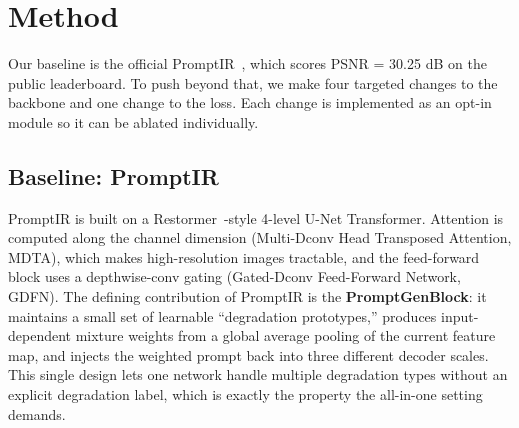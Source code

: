 \documentclass[12pt, a4paper]{article}
\begin{document}
\section{Method}
\label{sec:method}

Our baseline is the official PromptIR~\cite{potlapalli2023promptir}, which scores PSNR = 30.25 dB on the public leaderboard. To push beyond that, we make four targeted changes to the backbone and one change to the loss. Each change is implemented as an opt-in module so it can be ablated individually.

\subsection{Baseline: PromptIR}
PromptIR is built on a Restormer~\cite{zamir2022restormer}-style 4-level U-Net Transformer. Attention is computed along the channel dimension (Multi-Dconv Head Transposed Attention, MDTA), which makes high-resolution images tractable, and the feed-forward block uses a depthwise-conv gating (Gated-Dconv Feed-Forward Network, GDFN). The defining contribution of PromptIR is the \textbf{PromptGenBlock}: it maintains a small set of learnable ``degradation prototypes,'' produces input-dependent mixture weights from a global average pooling of the current feature map, and injects the weighted prompt back into three different decoder scales. This single design lets one network handle multiple degradation types without an explicit degradation label, which is exactly the property the all-in-one setting demands.
\end{document}
